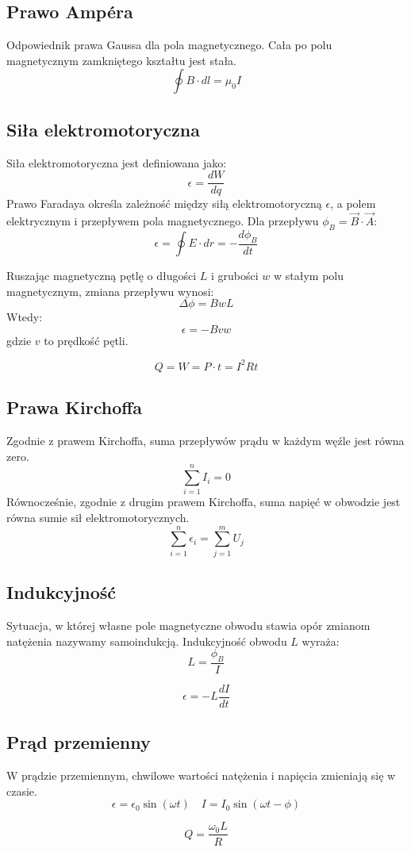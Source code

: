 \documentclass{../notatki}
\begin{document}
\subsection{Prawo Ampéra}

Odpowiednik prawa Gaussa dla pola magnetycznego. Cała po polu magnetycznym
zamkniętego kształtu jest stała.
$$
\oint B \cdot dl = \mu_0 I
$$

\subsection{Siła elektromotoryczna}

Siła elektromotoryczna jest definiowana jako:
$$
\epsilon = \frac{dW}{dq}
$$
Prawo Faradaya określa zależność między siłą elektromotoryczną
$\epsilon$, a polem elektrycznym i przepływem pola magnetycznego. Dla
przepływu $\phi_B = \vec{B} \cdot \vec{A}$:
$$\epsilon = \oint E \cdot dr = -
\frac{d \phi_B}{dt}$$

Ruszając magnetyczną pętlę o długości $L$ i grubości $w$ w stałym
polu magnetycznym, zmiana przepływu wynosi:
$$
\Delta \phi = BwL
$$
Wtedy:
$$
\epsilon = - Bvw
$$
gdzie $v$ to prędkość pętli.

$$
Q = W = P \cdot t = I^2 Rt
$$

\subsection{Prawa Kirchoffa}

Zgodnie z prawem Kirchoffa, suma przepływów prądu w każdym węźle jest
równa zero.
$$
\sum_{i=1}^{n} I_i = 0
$$
Równocześnie, zgodnie z drugim prawem Kirchoffa, suma napięć w obwodzie
jest równa sumie sił elektromotorycznych.
$$
\sum_{i=1}^{n} \epsilon_i = \sum_{j=1}^{m} U_j
$$

\subsection{Indukcyjność}

Sytuacja, w której własne pole magnetyczne obwodu stawia opór zmianom
natężenia nazywamy samoindukcją. Indukcyjność obwodu $L$ wyraża:
$$
L = \frac{\phi_B}{I}
$$

$$
\epsilon = - L \frac{dI}{dt}
$$

\subsection{Prąd przemienny}

W prądzie przemiennym, chwilowe wartości natężenia i napięcia
zmieniają się w czasie.
$$
\epsilon = \epsilon_0 \sin(\omega t) \quad I = I_0 \sin(\omega t - \phi)
$$

$$
Q = \frac{\omega_0 L}{R}
$$
\end{document}
